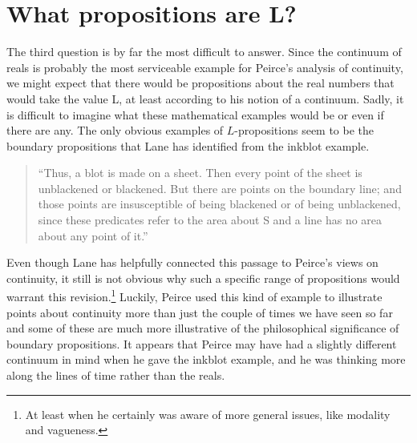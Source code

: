 \section{What propositions are L?}

The third question is by far the most difficult to answer. Since the continuum of reals is probably the most serviceable example for Peirce's analysis of continuity, we might expect that there would be propositions about the real numbers that would take the value L, at least according to his notion of a continuum. Sadly, it is difficult to imagine what these mathematical examples would be or even if there are any. The only obvious examples of $L$-propositions seem to be the boundary propositions that Lane has identified from the inkblot example.
\begin{quotation}
\noindent``Thus, a blot is made on a sheet. Then every point of the sheet is unblackened or blackened. But there are points on the boundary line; and those points are insusceptible of being blackened or of being unblackened, since these predicates refer to the area about S and a line has no area about any point of it.''
\end{quotation}
\noindent Even though Lane has helpfully connected this passage to Peirce's views on continuity, it still is not obvious why such a specific range of propositions would warrant this revision.\footnote{At least when he certainly was aware of more general issues, like modality and vagueness.} Luckily, Peirce used this kind of example to illustrate points about continuity more than just the couple of times we have seen so far and some of these are much more illustrative of the philosophical significance of boundary propositions. It appears that Peirce may have had a slightly different continuum in mind when he gave the inkblot example, and he was thinking more along the lines of time rather than the reals.

